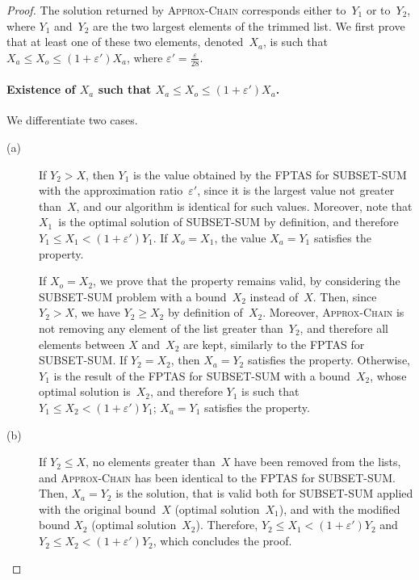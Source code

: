 \documentclass[a4paper]{article}
\theoremstyle{plain}
\theoremstyle{definition}
\theoremstyle{remark}
\newcommand{\approxchain}{\textsc{Ap\-prox-Chain}}
\begin{document}
\begin{proof}
The solution returned by \approxchain\xspace corresponds either to~$Y_1$ or to~$Y_2$, where $Y_1$ and~$Y_2$ are the
two largest elements of the trimmed list. We first prove that at least
one of these two elements, denoted~$X_a$, is such that  
$X_a \leq X_o \leq (1+\varepsilon')X_a$, where $\varepsilon'=
\frac{\varepsilon}{28}$. 




\paragraph{Existence of $X_a$ such that $X_a \leq X_o \leq (1+\varepsilon')X_a$. }
We differentiate two cases. 

\begin{description}
\item[(a)] If $Y_2 > X$, then $Y_1$ is the value obtained by the FPTAS
  for SUBSET-SUM \cite{cormen} with the approximation
  ratio~$\varepsilon'$, since it is the largest value not greater
  than~$X$, and our algorithm is identical for such values.  Moreover,
  note that $X_1$~is the optimal solution of SUBSET-SUM by definition,
  and therefore $Y_1 \leq X_1<(1+\varepsilon')Y_1$.  If $X_o=X_1$, the
  value $X_a=Y_1$ satisfies the property.  

  If $X_o=X_2$, we prove that the property remains valid, by
  considering the SUBSET-SUM problem with a bound~$X_2$ instead
  of~$X$. Then, since $Y_2>X$, we have $Y_2\geq X_2$ by definition
  of~$X_2$. Moreover, \approxchain\xspace is not removing any element
  of the list greater than~$Y_2$, and therefore all elements between
  $X$ and~$X_2$ are kept, similarly to the FPTAS for SUBSET-SUM. 
  If $Y_2=X_2$, then $X_a=Y_2$ satisfies the property. Otherwise,
  $Y_1$ is the result of the FPTAS for SUBSET-SUM with a bound~$X_2$,
  whose optimal solution is~$X_2$, and therefore $Y_1$ is such that 
  $Y_1 \leq X_2 <(1+\varepsilon')Y_1$; $X_a=Y_1$ satisfies the
  property.  



\item[(b)] If $Y_2 \leq X$, no elements greater than~$X$ have been
  removed from the lists, and \approxchain\xspace has been identical
  to the FPTAS for SUBSET-SUM. Then, $X_a=Y_2$ is the solution, that
  is valid both for SUBSET-SUM applied with the original bound~$X$
  (optimal solution~$X_1$), and with the modified bound $X_2$ (optimal
  solution~$X_2$). Therefore, $Y_2 \leq X_1<(1+\varepsilon')Y_2$ and $Y_2 \leq
  X_2<(1+\varepsilon')Y_2$, which concludes the proof. 
\end{description}


\end{proof}
\end{document}
